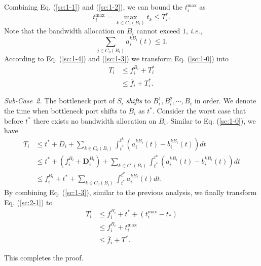 \documentclass[10pt, conference, letterpaper]{IEEEtran}
\begin{document}
\begin{IEEEproof}
\begin{equation}
\end{equation}
Combining Eq. (\ref{sc:1-1}) and (\ref{sc:1-2}), we can bound the $t_i^{\text{max}}$ as
\begin{equation}\label{sc:1-4}
	t_i^{\text{max}} = \max_{k \in C_0(B_i)} t_k \leq T_i^*.
\end{equation}
Note that the bandwidth allocation on $B_i$ cannot exceed $1$, \emph{i.e.},
\begin{equation}\label{sc:1-3}
	\sum_{j \in C_0(B_i)} a_i^{kB_i}(t) \leq 1.
\end{equation}
According to Eq. (\ref{sc:1-4}) and (\ref{sc:1-3}) we transform Eq. (\ref{sc:1-0}) into
\begin{equation}
	\begin{aligned}
		T_i & \leq f_i^{B_i} + T_i^*\\
		& \leq \overline{f}_i + T_i^*.
	\end{aligned}
\end{equation}

\emph{Sub-Case~2.} The bottleneck port of $S_i$ \emph{shifts} to $B_i^1,B_i^2,\cdots,B_i$ in order. We denote the time when bottleneck port shifts to $B_i$ as $t^*$. Consider the worst case that before $t^*$ there exists no bandwidth allocation on $B_i$. Similar to Eq. (\ref{sc:1-0}), we have
\begin{equation}\label{sc:2-1}
	\begin{aligned}
		T_i & \leq t^* + \overline{D}_i + \sum_{k \in C_0(B_i)}\int_{t^*}^{t^k}(a_i^{kB_i}(t)-b_i^{kB_i}(t))dt\\
		& \leq t^* + (f_i^{B_i} + \mathbf{D}_i^{B_i}) + \sum_{k \in C_0(B_i)}\int_{t^*}^{t^k}(a_i^{kB_i}(t)-b_i^{kB_i}(t))dt\\
		& \leq f_i^{B_i} + t^* + \sum_{k \in C_0(B_i)}\int_{t^*}^{t^k} a_i^{kB_i}(t)dt.
	\end{aligned}
\end{equation}
By combining Eq. (\ref{sc:1-3}), similar to the previous analysis, we finally transform Eq. (\ref{sc:2-1}) to
\begin{equation}
	\begin{aligned}
		T_i & \leq f_i^{B_i} + t^* + (t_i^{\text{max}} - t_*)\\
		& \leq f_i^{B_i} + t_i^{\text{max}}\\
		& \leq \overline{f}_i + T^*.
	\end{aligned}
\end{equation}

This completes the proof.
\end{IEEEproof}
\end{document}
